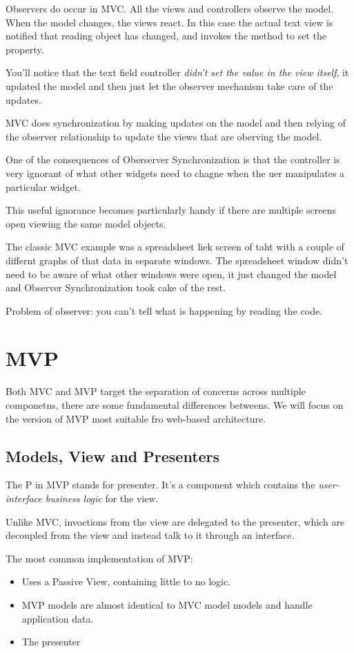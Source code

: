 \documentclass[a4paper, 11pt]{book}
\begin{document}
Observers do occur in MVC. All the views and controllers observe the model. When
the model changes, the views react. In this case the actual text view is
notified that reading object has changed, and invokes the method to set the
property. 

You'll notice that the text field controller \emph{didn't set the value in the
view itself}, it updated the model and then just let the observer mechanism take
care of the updates. 

MVC does synchronization by making updates on the model and then relying of the
observer relationship to update the views that are oberving the model.

One of the consequences of Oberserver Synchronization is that the controller is
very ignorant of what other widgets need to chagne when the uer manipulates a
particular widget.

This useful ignorance becomes particularly handy if there are multiple screens
open viewing the same model objects. 

The classic MVC example was a spreadsheet liek screen of taht with a couple of
differnt graphs of that data in separate windows. The spreadsheet window didn't
need to be aware of what other windows were open, it just changed the model and
Observer Synchronization took cake of the rest. 

Problem of observer: you can't tell what is happening by reading the code.


\section{MVP}
Both MVC and MVP target the separation of concerns across multiple componetns,
there are some fundamental differences betweens. We will focus on the version of
MVP most suitable fro web-based architecture.
\subsection{Models, View and Presenters}
The P in MVP stands for presenter. It's a component which contains the
\emph{user-interface business logic} for the view.

Unlike MVC, invoctions from the view are delegated to the presenter, which are
decoupled from the view and instead talk to it through an interface. 

The most common implementation of MVP:
\begin{itemize}
\item Uses a Passive View, containing little to no logic.
\item MVP models are almost identical to MVC model models and handle application
data. 
\item The presenter 
\end{itemize}
\end{document}
